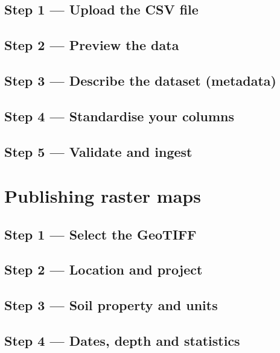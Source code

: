 \documentclass[
  10pt,
  b5paper,
  oneside]{book}
\begin{document}
\subsection{Step 1 --- Upload the CSV file}\label{step-1-upload-the-csv-file}

\subsection{Step 2 --- Preview the data}\label{step-2-preview-the-data}

\subsection{Step 3 --- Describe the dataset (metadata)}\label{step-3-describe-the-dataset-metadata}

\subsection{Step 4 --- Standardise your columns}\label{step-4-standardise-your-columns}

\subsection{Step 5 --- Validate and ingest}\label{step-5-validate-and-ingest}

\section{Publishing raster maps}\label{publishing-raster-maps}

\subsection{Step 1 --- Select the GeoTIFF}\label{step-1-select-the-geotiff}

\subsection{Step 2 --- Location and project}\label{step-2-location-and-project}

\subsection{Step 3 --- Soil property and units}\label{step-3-soil-property-and-units}

\subsection{Step 4 --- Dates, depth and statistics}\label{step-4-dates-depth-and-statistics}
\end{document}
